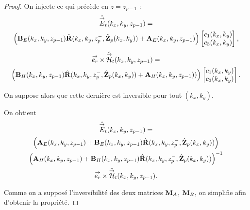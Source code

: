 \begin{proof}
      On injecte ce qui précède en \(z = z_{p-1}\) :
      \begin{multline*}
        \hat{{\overset{\rightarrow}{E}}}_t(k_x,k_y,z_{p-1}) = 
        \\
        \left(\mathbf{B}_{E}(k_x,k_y,z_{p-1})\hat{\mathbf{R}}(k_x,k_y,z_p^-,\hat{\mathbf{Z}}_p(k_x,k_y)) + \mathbf{A}_{E}(k_x,k_y,z_{p-1})\right)
        \begin{bmatrix}
          c_1(k_x,k_y) \\
          c_3(k_x,k_y)
        \end{bmatrix},
      \end{multline*}        
      \begin{multline*}
        {\overset{\rightarrow}{e_r}}\times\hat{{\overset{\rightarrow}{\mathcal{H}}}}_t(k_x,k_y,z_{p-1}) =
        \\
        \left(\mathbf{B}_{H}(k_x,k_y,z_{p-1})\hat{\mathbf{R}}(k_x,k_y,z_p^-,\hat{\mathbf{Z}}_p(k_x,k_y)) + \mathbf{A}_{H}(k_x,k_y,z_{p-1}))\right)
        \begin{bmatrix}
          c_1(k_x,k_y) \\
          c_3(k_x,k_y)
        \end{bmatrix}.
      \end{multline*}

      On suppose alors que cette dernière est inversible pour tout \((k_x,k_y)\).

      On obtient
      \begin{multline*}
        \hat{{\overset{\rightarrow}{E}}}_t(k_x,k_y,z_{p-1}) =
        \\
        \left(\mathbf{A}_{E}(k_x,k_y,z_{p-1}) + \mathbf{B}_{E}(k_x,k_y,z_{p-1})\hat{\mathbf{R}}(k_x,k_y,z_p^-,\hat{\mathbf{Z}}_p(k_x,k_y))\right) \\
        \left(\mathbf{A}_{H}(k_x,k_y,z_{p-1}) + \mathbf{B}_{H}(k_x,k_y,z_{p-1})\hat{\mathbf{R}}(k_x,k_y,z_p^-,\hat{\mathbf{Z}}_p(k_x,k_y))\right)^{-1}
        \\
        {\overset{\rightarrow}{e_r}}\times\hat{{\overset{\rightarrow}{\mathcal{H}}}}_t(k_x,k_y,z_{p-1}).
      \end{multline*}

      Comme on a supposé l'inversibilité des deux matrices \(\mathbf{M}_{A}\), \(\mathbf{M}_{B}\), on simplifie afin d'obtenir la propriété.
    \end{proof}

